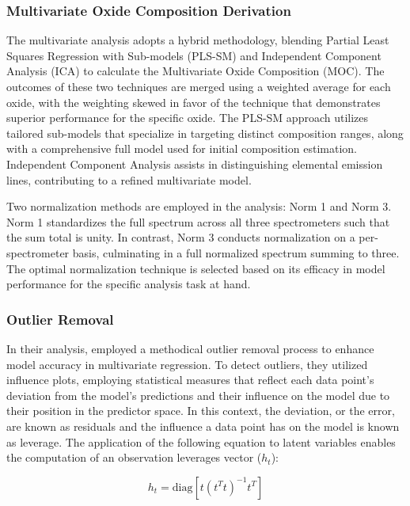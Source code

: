 \subsubsection{Multivariate Oxide Composition Derivation}\label{sec:moc_derivation}
The multivariate analysis adopts a hybrid methodology, blending Partial Least Squares Regression with Sub-models (PLS-SM) and Independent Component Analysis (ICA) to calculate the Multivariate Oxide Composition (MOC).
The outcomes of these two techniques are merged using a weighted average for each oxide, with the weighting skewed in favor of the technique that demonstrates superior performance for the specific oxide.
The PLS-SM approach utilizes tailored sub-models that specialize in targeting distinct composition ranges, along with a comprehensive full model used for initial composition estimation.
Independent Component Analysis assists in distinguishing elemental emission lines, contributing to a refined multivariate model.

Two normalization methods are employed in the analysis: Norm 1 and Norm 3.
Norm 1 standardizes the full spectrum across all three spectrometers such that the sum total is unity.
In contrast, Norm 3 conducts normalization on a per-spectrometer basis, culminating in a full normalized spectrum summing to three.
The optimal normalization technique is selected based on its efficacy in model performance for the specific analysis task at hand.

\subsubsection{Outlier Removal}\label{sec:outlier_removal}

In their analysis, \citet{andersonImprovedAccuracyQuantitative2017} employed a methodical outlier removal process to enhance model accuracy in multivariate regression. To detect outliers, they utilized influence plots, employing statistical measures that reflect each data point's deviation from the model's predictions and their influence on the model due to their position in the predictor space.
In this context, the deviation, or the error, are known as residuals and the influence a data point has on the model is known as leverage.
The application of the following equation to latent variables enables the computation of an observation leverages vector (\(h_t\)):

\begin{equation}
    h_t = \text{diag}\left[ t(t^T t)^{-1} t^T \right]
\end{equation}

